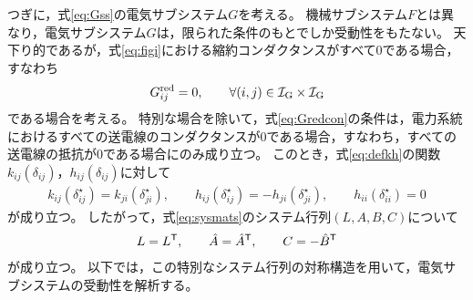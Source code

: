 \documentclass[tombow,dvipdfmx]{corona-a5-1.1}
\begin{document}
つぎに，式\ref{eq:Gss}の電気サブシステム$G$を考える。
機械サブシステム$F$とは異なり，電気サブシステム$G$は，限られた条件のもとでしか受動性をもたない。
天下り的であるが，式\ref{eq:figi}における縮約コンダクタンスがすべて0である場合，すなわち
\begin{align}\label{eq:Gredcon}
G^{\rm red}_{ij}=0,\qquad 
\forall (i, j) \in \mathcal{I}_{\rm G} \times \mathcal{I}_{\rm G}
\end{align}
である場合を考える。
特別な場合を除いて，式\ref{eq:Gredcon}の条件は，電力系統におけるすべての送電線のコンダクタンスが0である場合，すなわち，すべての送電線の抵抗が0である場合にのみ成り立つ。
このとき，式\ref{eq:defkh}の関数$k_{ij}(\delta_{ij})$，$h_{ij}(\delta_{ij})$に対して
\begin{align*}
k_{ij}(\delta_{ij}^{\star}) =
k_{ji}(\delta_{ji}^{\star})
,\qquad
h_{ij}(\delta_{ij}^{\star}) = 
- h_{ji}(\delta_{ji}^{\star}),\qquad
h_{ii}(\delta_{ii}^{\star}) = 0
\end{align*}
が成り立つ。
したがって，式\ref{eq:sysmats}のシステム行列$(L,A,B,C)$について
\begin{align}\label{eq:sysmatst}
L=L^{\sf T} ,\qquad
\hat{A} = \hat{A}^{\sf T},\qquad
C= -\hat{B}^{\sf T}
\end{align}
が成り立つ。
以下では，この特別なシステム行列の対称構造を用いて，電気サブシステムの受動性を解析する。
\end{document}
